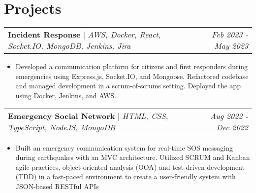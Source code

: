 \documentclass[letterpaper]{article}
\makeatletter
\newcommand{\resumeItemWithoutTitle}[1]{
  \item\small{
    {#1 \vspace{-2pt}}
  }
}
\newcommand{\resumeSubheadingWithoutTitle}[2]{
  \begin{tabular*}{\textwidth}{l@{\extracolsep{\fill}}r}
        \textbf{\textit{#1}} & \textit{\small #2} \\
    \end{tabular*}\vspace{-14pt}
}
\newcommand{\shortSection}[1]{
    \vspace{-6pt}
    \section{#1}
}
\newcommand{\projectHeading}[3]{
  \begin{tabular*}{\textwidth}{l@{\extracolsep{\fill}}r}
        \textbf{#1} 
        \hspace{-2pt} $\vert$ \hspace{-2pt} \small{\textit{#2}} 
        & 
        \textit{#3} \\
    \end{tabular*}\vspace{-2pt}
}
\newcommand{\resumeItemListStart}{\begin{itemize}}
\newcommand{\resumeItemListEnd}{\end{itemize}}
\makeatother
\begin{document}




\shortSection{Projects}
\vspace{3pt}
\projectHeading {Incident Response}{AWS, Docker, React, Socket.IO, MongoDB, Jenkins, Jira}{Feb 2023 - May 2023}
\resumeItemListStart
\resumeItemWithoutTitle{Developed a communication platform for citizens and first responders during emergencies using Express.js, Socket.IO, and Mongoose. Refactored codebase and managed development in a scrum-of-scrums setting. Deployed the app using Docker, Jenkins, and AWS.}
\resumeItemListEnd

\vspace{3pt}
\projectHeading {Emergency Social Network}{HTML, CSS, TypeScript, NodeJS, MongoDB}{Aug 2022 - Dec 2022}
\resumeItemListStart
\resumeItemWithoutTitle{Built an emergency communication system for real-time SOS messaging during earthquakes with an MVC architecture. Utilized SCRUM and Kanban agile practices, object-oriented analysis (OOA) and test-driven development (TDD) in a fast-paced environment to create a user-friendly system with JSON-based RESTful APIs}
\resumeItemListEnd

\end{document}
